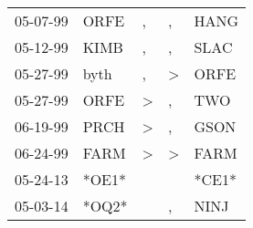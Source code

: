 \begin{supertabular}{lllll}
 05-07-99 &   ORFE &             , &             , &   HANG \\
 05-12-99 &   KIMB &             , &             , &   SLAC \\
 05-27-99 &   byth &             , &  \textgreater &   ORFE \\
 05-27-99 &   ORFE &  \textgreater &             , &    TWO \\
 06-19-99 &   PRCH &  \textgreater &             , &   GSON \\
 06-24-99 &   FARM &  \textgreater &  \textgreater &   FARM \\
 05-24-13 &  *OE1* &               &               &  *CE1* \\
 05-03-14 &  *OQ2* &               &             , &   NINJ \\
\end{supertabular}
